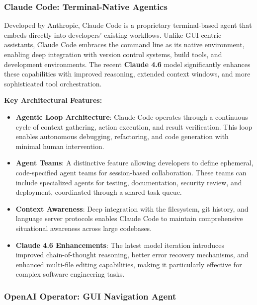 \subsubsection{Claude Code: Terminal-Native Agentics}

Developed by Anthropic, Claude Code is a proprietary terminal-based agent that embeds directly into developers' existing workflows. Unlike GUI-centric assistants, Claude Code embraces the command line as its native environment, enabling deep integration with version control systems, build tools, and development environments. The recent \textbf{Claude 4.6} model significantly enhances these capabilities with improved reasoning, extended context windows, and more sophisticated tool orchestration.

\textbf{Key Architectural Features:}

\begin{itemize}
    \item \textbf{Agentic Loop Architecture}: Claude Code operates through a continuous cycle of context gathering, action execution, and result verification. This loop enables autonomous debugging, refactoring, and code generation with minimal human intervention.

    \item \textbf{Agent Teams}: A distinctive feature allowing developers to define ephemeral, code-specified agent teams for session-based collaboration. These teams can include specialized agents for testing, documentation, security review, and deployment, coordinated through a shared task queue.

    \item \textbf{Context Awareness}: Deep integration with the filesystem, git history, and language server protocols enables Claude Code to maintain comprehensive situational awareness across large codebases.

    \item \textbf{Claude 4.6 Enhancements}: The latest model iteration introduces improved chain-of-thought reasoning, better error recovery mechanisms, and enhanced multi-file editing capabilities, making it particularly effective for complex software engineering tasks.

\end{itemize}
\subsubsection{OpenAI Operator: GUI Navigation Agent}

